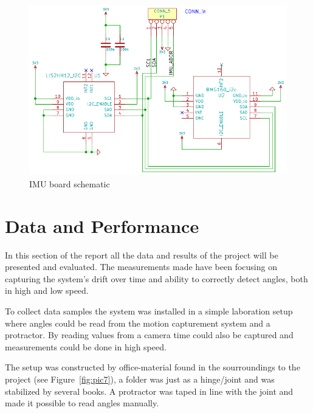\documentclass[a4paper, 12pt]{article}
\begin{document}
\begin{figure}[h!]%
    \centering
    \includegraphics{imu_schematic.pdf}
    \caption{IMU board schematic}
    \label{fig:pic6}
\end{figure}


\section*{Data and Performance}
In this section of the report all the data and results of the project will be presented and evaluated. The measurements made have been focusing on capturing the system's drift over time and ability to correctly detect angles, both in high and low speed.

To collect data samples the system was installed in a simple laboration setup where angles could be read from the motion capturement system and a protractor. By reading values from a camera time could also be captured and measurements could be done in high speed. 

The setup was constructed by office-material found in the sourroundings to the project (see Figure~\ref{fig:pic7}), a folder was just as a hinge/joint and was stabilized by several books. A protractor was taped in line with the joint and made it possible to read angles manually. 
\end{document}
